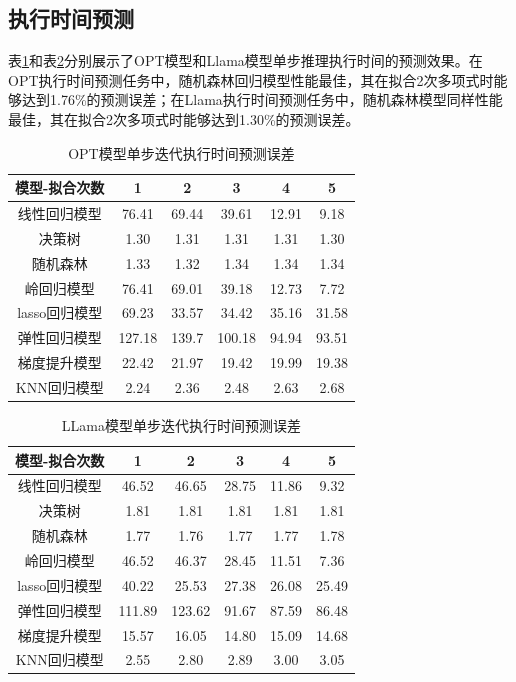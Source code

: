 \documentclass[a4paper, nosysfonts]{hpcchina}
\begin{document}
\subsection{执行时间预测}
表\ref{OPT模型单步迭代执行时间预测误差}和表\ref{LLama模型单步迭代执行时间预测误差}分别展示了OPT模型和Llama模型单步推理执行时间的预测效果。在OPT执行时间预测任务中，随机森林回归模型性能最佳，其在拟合2次多项式时能够达到1.76\%的预测误差；在Llama执行时间预测任务中，随机森林模型同样性能最佳，其在拟合2次多项式时能够达到1.30\%的预测误差。

\begin{table}[H]
  \centering
  \caption{OPT模型单步迭代执行时间预测误差}
  \label{OPT模型单步迭代执行时间预测误差}
  \small
  \begin{tabular}{|c|c|c|c|c|c|}
    \hline
    \textbf{模型-拟合次数} & \textbf{1} & \textbf{2} & \textbf{3} & \textbf{4} & \textbf{5} \\ \hline
    线性回归模型 & 76.41 & 69.44 & 39.61 & 12.91 & 9.18 \\ \hline
    决策树 & 1.30 & 1.31 & 1.31 & 1.31 & 1.30 \\ \hline
    随机森林 & 1.33 & 1.32 & 1.34 & 1.34 & 1.34 \\ \hline
    岭回归模型 & 76.41 & 69.01 & 39.18 & 12.73 & 7.72 \\ \hline
    lasso回归模型 & 69.23 & 33.57 & 34.42 & 35.16 & 31.58  \\ \hline
    弹性回归模型 & 127.18 & 139.7 & 100.18 & 94.94 & 93.51  \\ \hline
    梯度提升模型 & 22.42 & 21.97 & 19.42 & 19.99 & 19.38  \\ \hline
    KNN回归模型 & 2.24 & 2.36 & 2.48 & 2.63 & 2.68 \\ \hline
  \end{tabular}
\end{table}

\begin{table}[H]
  \centering
  \caption{LLama模型单步迭代执行时间预测误差}
  \label{LLama模型单步迭代执行时间预测误差}
  \small
  \begin{tabular}{|c|c|c|c|c|c|}
    \hline
    \textbf{模型-拟合次数} & \textbf{1} & \textbf{2} & \textbf{3} & \textbf{4} & \textbf{5} \\ \hline
    线性回归模型 & 46.52 & 46.65 & 28.75 & 11.86 & 9.32 \\ \hline
    决策树 & 1.81 & 1.81 & 1.81 & 1.81 & 1.81 \\ \hline
    随机森林 & 1.77 & 1.76 & 1.77 & 1.77 & 1.78 \\ \hline
    岭回归模型 & 46.52 & 46.37 & 28.45 & 11.51 & 7.36 \\ \hline
    lasso回归模型 & 40.22 & 25.53 & 27.38 & 26.08 & 25.49 \\ \hline
    弹性回归模型 & 111.89 & 123.62 & 91.67 & 87.59 & 86.48 \\ \hline
    梯度提升模型 & 15.57 & 16.05 & 14.80 & 15.09 & 14.68 \\ \hline
    KNN回归模型 & 2.55 & 2.80 & 2.89 & 3.00 & 3.05 \\ \hline
  \end{tabular}
\end{table}
\end{document}
